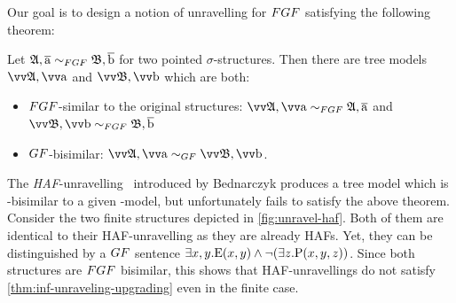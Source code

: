 Our goal is to design a notion of unravelling for $\FGF$ satisfying the following theorem:
\begin{theorem}\label{thm:inf-unraveling-upgrading}
  Let $\str{A}, \elemtuplea \bisimto_{\FGF} \str{B}, \elemtupleb$ for two pointed $\sigma$-structures.
  Then there are tree models $\unravel{A}, \elemtuptuplea$ and $\unravel{B}, \elemtuptupleb$ which are both:
  \begin{itemize}
    \item $\FGF$-similar to the original structures: $\unravel{A}, \elemtuptuplea \bisimto_{\FGF} \str{A}, \elemtuplea$ and $\unravel{B}, \elemtuptupleb \bisimto_{\FGF} \str{B}, \elemtupleb$
    \item $\GF$-bisimilar: $\unravel{A}, \elemtuptuplea \bisimto_{\GF} \unravel{B}, \elemtuptupleb$.
  \end{itemize}
\end{theorem}
The \emph{HAF}-unravelling~\cite[Sec 3.3]{Bednarczyk21} introduced by Bednarczyk produces a tree model which is \FGF-bisimilar to a given \FGF-model, but unfortunately fails to satisfy the above theorem.
Consider the two finite structures depicted in \cref{fig:unravel-haf}.
Both of them are identical to their HAF-unravelling as they are already HAFs.
Yet, they can be distinguished by a $\GF$ sentence $\exists{x,y}. \mathrm{E}(x,y) \land \lnot (\exists z. \mathrm{P}(x,y,z))$.
Since both structures are $\FGF$ bisimilar, this shows that HAF-unravellings do not satisfy \cref{thm:inf-unraveling-upgrading} even in the finite case.


